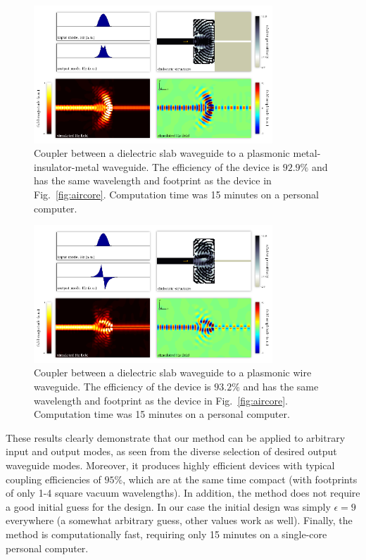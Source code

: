 \documentclass[letterpaper,10pt]{article}
\begin{document}
\begin{figure}[htbp]
    \centering
    \includegraphics[width=0.8\textwidth]{4}
    \caption{Coupler between a dielectric slab waveguide to 
            a plasmonic metal-insulator-metal waveguide.
        The efficiency of the device is $92.9\%$ and 
            has the same wavelength and footprint as the device in
            Fig.~\ref{fig:aircore}.
        Computation time was 15 minutes on a personal computer.
        }
        \label{fig:mim}
\end{figure}
\begin{figure}[htbp]
    \centering
    \includegraphics[width=0.8\textwidth]{5}
    \caption{Coupler between a dielectric slab waveguide to 
            a plasmonic wire waveguide.
        The efficiency of the device is $93.2\%$ and 
            has the same wavelength and footprint as the device in
            Fig.~\ref{fig:aircore}.
        Computation time was 15 minutes on a personal computer.
        }
        \label{fig:wire}
\end{figure}

These results clearly demonstrate that our method can
    be applied to arbitrary input and output modes,
    as seen from the diverse selection of desired output waveguide modes.
Moreover, it produces highly efficient devices with  
    typical coupling efficiencies of $95\%$,
    which are at the same time compact 
    (with footprints of only 1-4 square vacuum wavelengths).
In addition, the method does not require a good initial guess for the design.
In our case the initial design was simply $\epsilon = 9$ everywhere
        (a somewhat arbitrary guess, other values work as well).
Finally, the method is computationally fast, 
    requiring only 15 minutes on a single-core personal computer.
\end{document}
